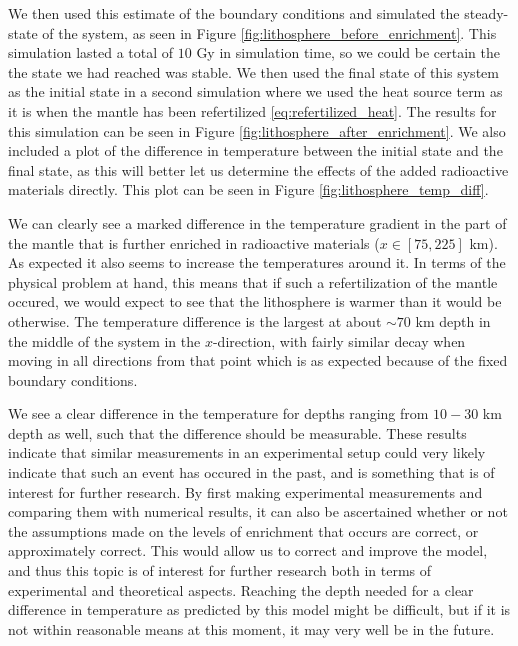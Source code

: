 \documentclass[reprint,english,notitlepage]{revtex4-1}  %
\begin{document}
We then used this estimate of the boundary conditions and simulated the steady-state of the system, as seen in Figure \ref{fig:lithosphere_before_enrichment}. This simulation lasted a total of $10$ Gy in simulation time, so we could be certain the the state we had reached was stable. We then used the final state of this system as the initial state in a second simulation where we used the heat source term as it is when the mantle has been refertilized \eqref{eq:refertilized_heat}. The results for this simulation can be seen in Figure \ref{fig:lithosphere_after_enrichment}. We also included a plot of the difference in temperature between the initial state and the final state, as this will better let us determine the effects of the added radioactive materials directly. This plot can be seen in Figure \ref{fig:lithosphere_temp_diff}. 

We can clearly see a marked difference in the temperature gradient in the part of the mantle that is further enriched in radioactive materials ($x \in [75,225]$ km). As expected it also seems to increase the temperatures around it. In terms of the physical problem at hand, this means that if such a refertilization of the mantle occured, we would expect to see that the lithosphere is warmer than it would be otherwise. The temperature difference is the largest at about $\sim 70$ km depth in the middle of the system in the $x$-direction, with fairly similar decay when moving in all directions from that point which is as expected because of the fixed boundary conditions. 

We see a clear difference in the temperature for depths ranging from $10-30$ km depth as well, such that the difference should be measurable. These results indicate that similar measurements in an experimental setup could very likely indicate that such an event has occured in the past, and is something that is of interest for further research. By first making experimental measurements and comparing them with numerical results, it can also be ascertained whether or not the assumptions made on the levels of enrichment that occurs are correct, or approximately correct. This would allow us to correct and improve the model, and thus this topic is of interest for further research both in terms of experimental and theoretical aspects. Reaching the depth needed for a clear difference in temperature as predicted by this model might be difficult, but if it is not within reasonable means at this moment, it may very well be in the future.
\end{document}
